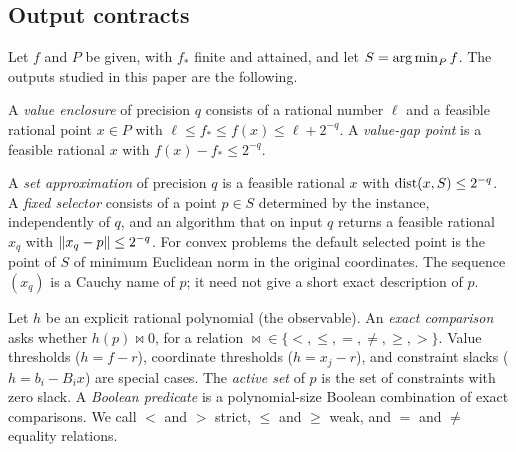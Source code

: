 \subsection{Output contracts}
\label{sec:models-outputs}

Let $f$ and $P$ be given, with $f_*$ finite and attained, and let
$S=\operatorname*{arg\,min}_Pf$. The outputs studied in this paper are the following.

\begin{definition}[Values]
\label{def:models-value}
A \emph{value enclosure} of precision $q$ consists of a rational number
$\ell$ and a feasible rational point $x\in P$ with
$\ell\le f_*\le f(x)\le\ell+2^{-q}$. A \emph{value-gap point} is a feasible
rational $x$ with $f(x)-f_*\le2^{-q}$.
\end{definition}

\begin{definition}[Points]
\label{def:models-points}
A \emph{set approximation} of precision $q$ is a feasible rational $x$ with
$\operatorname{dist}(x,S)\le2^{-q}$. A \emph{fixed selector} consists of a point $p\in S$
determined by the instance, independently of $q$, and an algorithm that on
input $q$ returns a feasible rational $x_q$ with $\left\lVert x_q-p\right\rVert\le2^{-q}$.
For convex problems the default selected point is the point of $S$ of minimum
Euclidean norm in the original coordinates. The sequence $(x_q)$ is a
Cauchy name of $p$; it need not give a short exact description of $p$.
\end{definition}

\begin{definition}
\label{def:models-predicates}
Let $h$ be an explicit rational polynomial (the observable). An \emph{exact
comparison} asks whether $h(p)\bowtie0$, for a relation
${\bowtie}\in\{<,\le,=,\ne,\ge,>\}$. Value thresholds ($h=f-r$), coordinate
thresholds ($h=x_j-r$), and constraint slacks ($h=b_i-B_ix$) are special
cases. The \emph{active set} of $p$ is the set of constraints with zero
slack. A \emph{Boolean predicate} is a polynomial-size Boolean combination of
exact comparisons. We call $<$ and $>$ strict, $\le$ and $\ge$ weak, and $=$
and $\ne$ equality relations.
\end{definition}

